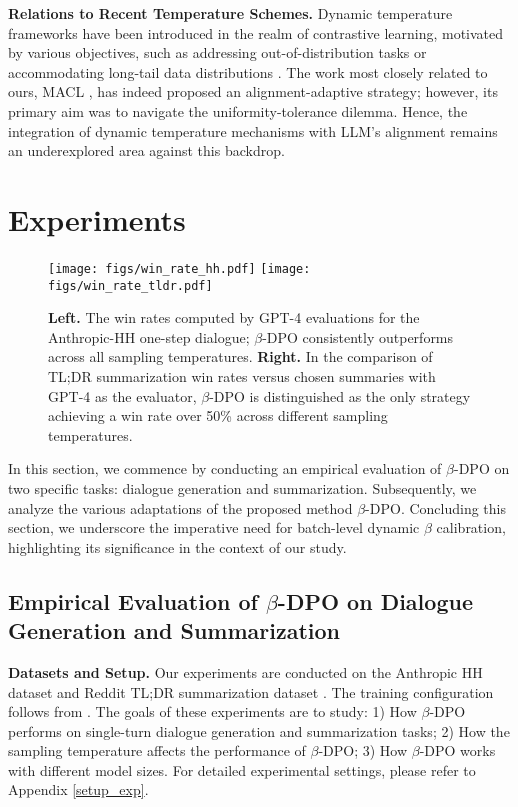 \textbf{Relations to Recent Temperature Schemes.}
Dynamic temperature frameworks have been introduced in the realm of contrastive learning, motivated by various objectives, such as addressing out-of-distribution tasks \cite{Uncertainty} or accommodating long-tail data distributions \cite{long_tail}. The work most closely related to ours, MACL \cite{MACL}, has indeed proposed an alignment-adaptive strategy; however, its primary aim was to navigate the uniformity-tolerance dilemma. Hence, the integration of dynamic temperature mechanisms with LLM's alignment remains an underexplored area against this backdrop.\section{Experiments}
\label{Experiments}
\begin{figure}[t]
    \centering
    \texttt{[image: figs/win\_rate\_hh.pdf]}
    \texttt{[image: figs/win\_rate\_tldr.pdf]}
    \caption{
    \textbf{Left.} 
    The win rates computed by GPT-4 evaluations for the Anthropic-HH one-step dialogue; $\beta$-DPO consistently outperforms across all sampling temperatures.
    \textbf{Right.} 
    In the comparison of TL;DR summarization win rates versus chosen summaries with GPT-4 as the evaluator, $\beta$-DPO is distinguished as the only strategy achieving a win rate over 50\% across different sampling temperatures.
    }
    \label{fig:dialogue-main}
\end{figure}

In this section, we commence by conducting an empirical evaluation of $\beta$-DPO on two specific tasks: dialogue generation and summarization. Subsequently, we analyze the various adaptations of the proposed method $\beta$-DPO. Concluding this section, we underscore the imperative need for batch-level dynamic $\beta$ calibration, highlighting its significance in the context of our study.

\subsection{Empirical Evaluation of $\beta$-DPO on Dialogue Generation and Summarization}
\textbf{Datasets and Setup.} Our experiments are conducted on the Anthropic HH dataset \cite{Bai2022training} and Reddit TL;DR summarization dataset \cite{tldr_dataset}. The training configuration follows from \citet{DPO}. The goals of these experiments are to study: 1) How $\beta$-DPO performs on single-turn dialogue generation and summarization tasks; 2) How the sampling temperature affects the performance of $\beta$-DPO; 3) How $\beta$-DPO works with different model sizes. For detailed experimental settings, please refer to Appendix \ref{setup_exp}.

